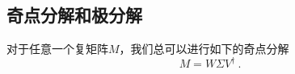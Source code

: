 


\subsection{奇点分解和极分解}
对于任意一个复矩阵$M$，我们总可以进行如下的奇点分解
\begin{equation}
M=W \Sigma V^{\dagger}~.
\end{equation}



